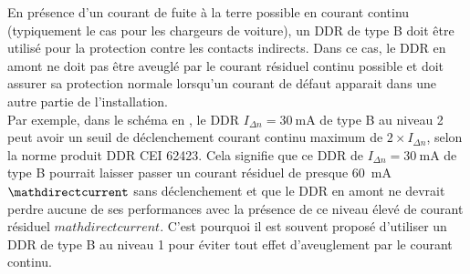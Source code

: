 \begin{figure}
{}
\end{figure}

En présence d'un courant de fuite à la terre possible en courant continu (typiquement le cas pour les chargeurs de voiture), un DDR de type B doit être utilisé pour la protection contre les contacts indirects. Dans ce cas, le DDR en amont ne doit pas être aveuglé par le courant résiduel continu possible et doit assurer sa protection normale lorsqu'un courant de défaut apparait dans une autre partie de l'installation.\\
Par exemple, dans le schéma en , le DDR $I_{\Delta n} = \SI{30}{\milli\ampere}$ de type B au niveau 2 peut avoir un seuil de déclenchement courant continu maximum de $2 \times I_{\Delta n}$, selon la norme produit DDR CEI 62423\supercite{IEC:62423-2009}. Cela signifie que ce DDR de $I_{\Delta n} = \SI{30}{\milli\ampere}$ de type B pourrait laisser passer un courant résiduel de presque \SI{60}{\milli\ampere} $\mathdirectcurrent$ sans déclenchement et que le DDR en amont ne devrait perdre aucune de ses performances avec la présence de ce niveau élevé de courant résiduel $mathdirectcurrent$. C'est pourquoi il est souvent proposé d'utiliser un DDR de type B au niveau 1 pour éviter tout effet d'aveuglement par le courant continu.\\

